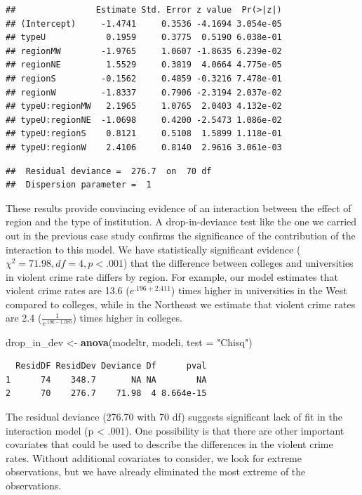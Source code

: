 \documentclass[
]{krantz}
\newenvironment{Shaded}{\begin{snugshade}}{\end{snugshade}}
\newcommand{\DataTypeTok}[1]{\textcolor[rgb]{0.27,0.27,0.27}{#1}}
\newcommand{\KeywordTok}[1]{\textcolor[rgb]{0.27,0.27,0.27}{\textbf{#1}}}
\newcommand{\NormalTok}[1]{#1}
\newcommand{\StringTok}[1]{\textcolor[rgb]{0.5,0.5,0.5}{#1}}
\begin{document}
\begin{verbatim}
##                Estimate Std. Error z value  Pr(>|z|)
## (Intercept)     -1.4741     0.3536 -4.1694 3.054e-05
## typeU            0.1959     0.3775  0.5190 6.038e-01
## regionMW        -1.9765     1.0607 -1.8635 6.239e-02
## regionNE         1.5529     0.3819  4.0664 4.775e-05
## regionS         -0.1562     0.4859 -0.3216 7.478e-01
## regionW         -1.8337     0.7906 -2.3194 2.037e-02
## typeU:regionMW   2.1965     1.0765  2.0403 4.132e-02
## typeU:regionNE  -1.0698     0.4200 -2.5473 1.086e-02
## typeU:regionS    0.8121     0.5108  1.5899 1.118e-01
## typeU:regionW    2.4106     0.8140  2.9616 3.061e-03
\end{verbatim}

\begin{verbatim}
##  Residual deviance =  276.7  on  70 df 
##  Dispersion parameter =  1
\end{verbatim}

These results provide convincing evidence of an interaction between the effect of region and the type of institution. A drop-in-deviance test like the one we carried out in the previous case study confirms the significance of the contribution of the interaction to this model. We have statistically significant evidence (\(\chi^2=71.98, df=4, p<.001\)) that the difference between colleges and universities in violent crime rate differs by region. For example, our model estimates that violent crime rates are 13.6 (\(e^{.196+2.411}\)) times higher in universities in the West compared to colleges, while in the Northeast we estimate that violent crime rates are 2.4 (\(\frac{1}{e^{.196-1.070}}\)) times higher in colleges.

\begin{Shaded}
\begin{Highlighting}[]
\NormalTok{drop_in_dev <-}\StringTok{ }\KeywordTok{anova}\NormalTok{(modeltr, modeli, }\DataTypeTok{test =} \StringTok{"Chisq"}\NormalTok{)}
\end{Highlighting}
\end{Shaded}

\begin{verbatim}
  ResidDF ResidDev Deviance Df      pval
1      74    348.7       NA NA        NA
2      70    276.7    71.98  4 8.664e-15
\end{verbatim}

The residual deviance (276.70 with 70 df) suggests significant lack of fit in the interaction model (p \textless{} .001). One possibility is that there are other important covariates that could be used to describe the differences in the violent crime rates. Without additional covariates to consider, we look for extreme observations, but we have already eliminated the most extreme of the observations.
\end{document}
